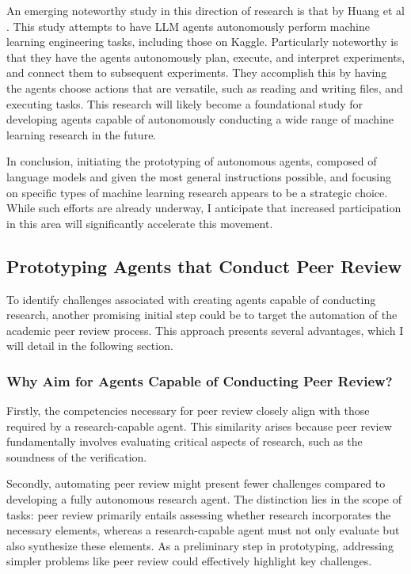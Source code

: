 \documentclass{article}
\begin{document}
An emerging noteworthy study in this direction of research is that by Huang et al \cite{huang2023benchmarking}. This study attempts to have LLM agents autonomously perform machine learning engineering tasks, including those on Kaggle. Particularly noteworthy is that they have the agents autonomously plan, execute, and interpret experiments, and connect them to subsequent experiments. They accomplish this by having the agents choose actions that are versatile, such as reading and writing files, and executing tasks. This research will likely become a foundational study for developing agents capable of autonomously conducting a wide range of machine learning research in the future.

In conclusion, initiating the prototyping of autonomous agents, composed of language models and given the most general instructions possible, and focusing on specific types of machine learning research appears to be a strategic choice. While such efforts are already underway, I anticipate that increased participation in this area will significantly accelerate this movement.

\subsection{Prototyping Agents that Conduct Peer Review}
To identify challenges associated with creating agents capable of conducting research, another promising initial step could be to target the automation of the academic peer review process. This approach presents several advantages, which I will detail in the following section.

\subsubsection{Why Aim for Agents Capable of Conducting Peer Review?}

Firstly, the competencies necessary for peer review closely align with those required by a research-capable agent. This similarity arises because peer review fundamentally involves evaluating critical aspects of research, such as the soundness of the verification.

Secondly, automating peer review might present fewer challenges compared to developing a fully autonomous research agent. The distinction lies in the scope of tasks: peer review primarily entails assessing whether research incorporates the necessary elements, whereas a research-capable agent must not only evaluate but also synthesize these elements. As a preliminary step in prototyping, addressing simpler problems like peer review could effectively highlight key challenges.
\end{document}
